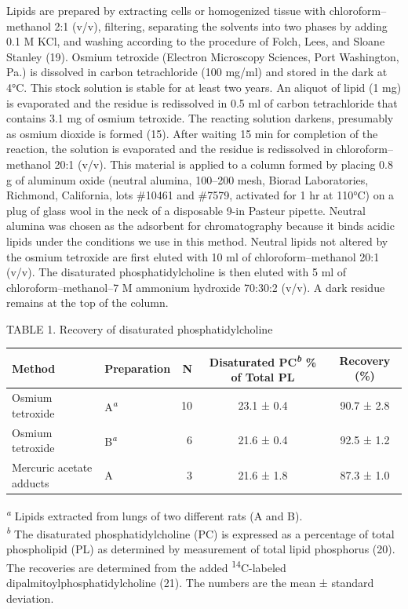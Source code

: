 \documentclass{article}
\begin{document}
Lipids are prepared by extracting cells or homogenized tissue with chloroform–methanol 2:1 (v/v), filtering, separating the solvents into two phases by adding 0.1 M KCl, and washing according to the procedure of Folch, Lees, and Sloane Stanley (19). Osmium tetroxide (Electron Microscopy Sciences, Port Washington, Pa.) is dissolved in carbon tetrachloride (100 mg/ml) and stored in the dark at 4°C. This stock solution is stable for at least two years. An aliquot of lipid (1 mg) is evaporated and the residue is redissolved in 0.5 ml of carbon tetrachloride that contains 3.1 mg of osmium tetroxide. The reacting solution darkens, presumably as osmium dioxide is formed (15). After waiting 15 min for completion of the reaction, the solution is evaporated and the residue is redissolved in chloroform–methanol 20:1 (v/v). This material is applied to a column formed by placing 0.8 g of aluminum oxide (neutral alumina, 100–200 mesh, Biorad Laboratories, Richmond, California, lots \#10461 and \#7579, activated for 1 hr at 110°C) on a plug of glass wool in the neck of a disposable 9-in Pasteur pipette. Neutral alumina was chosen as the adsorbent for chromatography because it binds acidic lipids under the conditions we use in this method. Neutral lipids not altered by the osmium tetroxide are first eluted with 10 ml of chloroform–methanol 20:1 (v/v). The disaturated phosphatidylcholine is then eluted with 5 ml of chloroform–methanol–7 M ammonium hydroxide 70:30:2 (v/v). A dark residue remains at the top of the column.

\begin{center}
\noindent TABLE 1. Recovery of disaturated phosphatidylcholine\par\smallskip
\begin{tabular}{llrcc}
\toprule
Method & Preparation & N & Disaturated PC\textsuperscript{\emph{b}} \% of Total PL & Recovery (\%) \\
\midrule
Osmium tetroxide & A\textsuperscript{\emph{a}} & 10 & 23.1 ± 0.4 & 90.7 ± 2.8 \\
Osmium tetroxide & B\textsuperscript{\emph{a}} & 6 & 21.6 ± 0.4 & 92.5 ± 1.2 \\
Mercuric acetate adducts & A & 3 & 21.6 ± 1.8 & 87.3 ± 1.0 \\
\bottomrule
\end{tabular}
\end{center}
{\small\noindent\textsuperscript{\emph{a}} Lipids extracted from lungs of two different rats (A and B).\\
\textsuperscript{\emph{b}} The disaturated phosphatidylcholine (PC) is expressed as a percentage of total phospholipid (PL) as determined by measurement of total lipid phosphorus (20). The recoveries are determined from the added \textsuperscript{14}C-labeled dipalmitoylphosphatidylcholine (21). The numbers are the mean ± standard deviation.\par}
\end{document}
